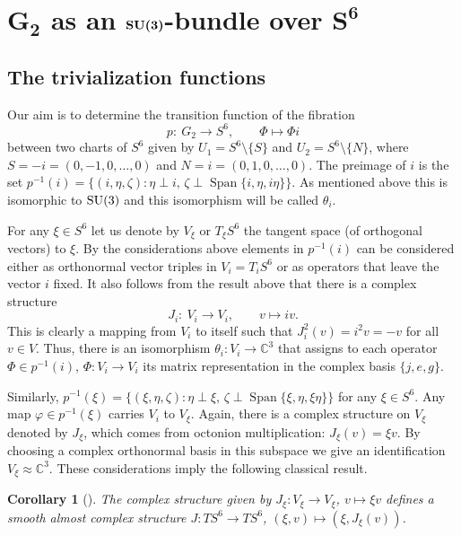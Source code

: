 \documentclass[pdftex]{sigma}
\numberwithin{equation}{section}
\newtheorem{Corollary}[Theorem]{Corollary}
\DeclareMathOperator{\Span}{Span}
\newcommand{\SC}{\mathbb{C}} %
\begin{document}
\section[$G_2$ as an ${\rm SU}(3)$-bundle over $S^6$]{$\boldsymbol{G_2}$ as an $\boldsymbol{{\rm SU}(3)}$-bundle over $\boldsymbol{S^6}$}\label{section3}

\subsection{The trivialization functions}\label{section3.1}

Our aim is to determine the transition function of the fibration
\[p\colon \ G_2 \rightarrow S^6, \qquad \Phi \mapsto \Phi i\]
between two charts of $S^6$ given by $U_1=S^6 {\setminus} \{S\} $ and $U_2=S^6 {\setminus} \{N\}$, where $S=-i=(0,-1,0,\dots,0)$ and $N=i=(0,1,0,\dots,0)$. The preimage of $i$ is the set $p^{-1}(i)=\{(i,\eta,\zeta)\colon \eta \perp i, \,\zeta \perp \Span \{i,\eta, i \eta \} \}$. As mentioned above this is isomorphic to ${\rm SU}(3)$ and this isomorphism will be called $\theta_i$.

For any $\xi \in S^6$ let us denote by $V_\xi$ or $T_\xi S^6$ the tangent space (of orthogonal vectors) to $\xi$.
By the considerations above elements in $p^{-1}(i)$ can be considered either as orthonormal vector triples in $V_i=T_iS^6$ or as operators that leave the vector $i$ fixed.
It also follows from the result above that there is a complex structure
\[J_i\colon \ V_i \rightarrow V_i, \qquad v \mapsto iv.\]
This is clearly a mapping from $V_i$ to itself such that $J_{i}^2(v)=i^2v=-v$ for all $v \in V$. Thus, there is an isomorphism $\theta_{i}\colon V_i \rightarrow \SC^3$ that assigns to each operator $\Phi \in p^{-1}(i)$, $\Phi\colon V_i \rightarrow V_i$ its matrix representation in the complex basis $\{j,e,g\}$.

Similarly, $p^{-1}(\xi)=\{(\xi,\eta,\zeta)\colon \eta \perp \xi, \,\zeta \perp \Span \{\xi,\eta, \xi \eta \} \}$ for any $\xi \in S^6$. Any map $\varphi \in p^{-1}(\xi)$ carries $V_i$ to $V_{\xi}$. Again, there is a complex structure on $V_\xi$ denoted by $J_\xi$, which comes from octonion multiplication: $J_\xi(v)=\xi v$. By choosing a complex orthonormal basis in this subspace we give an identification $V_\xi \approx \SC^3$. These considerations imply the following classical result.

\begin{Corollary}[{\cite{ehresmann1950varietes}}] The complex structure given by $J_\xi\colon V_\xi \rightarrow V_\xi$, $v \mapsto \xi v$ defines a smooth almost complex structure $J\colon TS^6 \rightarrow TS^6$, $(\xi,v) \mapsto (\xi, J_\xi(v))$.
\end{Corollary}
\end{document}
